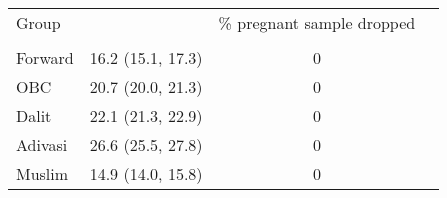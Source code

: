 \begin{tabular}{lccc}
\toprule
Group &  & \% pregnant sample dropped \\\\
\midrule
Forward&16.2 (15.1, 17.3)&0\\
OBC&20.7 (20.0, 21.3)&0\\
Dalit&22.1 (21.3, 22.9)&0\\
Adivasi&26.6 (25.5, 27.8)&0\\
Muslim&14.9 (14.0, 15.8)&0\\
\bottomrule
\end{tabular}
